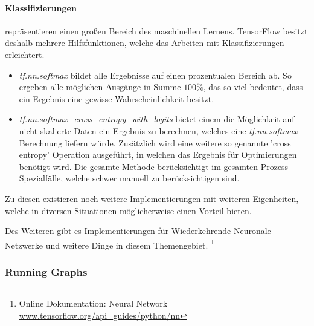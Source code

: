 \paragraph{Klassifizierungen} repräsentieren einen großen Bereich des maschinellen Lernens. 
TensorFlow besitzt deshalb mehrere Hilfsfunktionen, welche das Arbeiten mit Klassifizierungen erleichtert. 
\begin{itemize}
	\item \textit{tf.nn.softmax} bildet alle Ergebnisse auf einen prozentualen Bereich ab. 
	So ergeben alle möglichen Ausgänge in Summe $100\%$, das so viel bedeutet, dass ein Ergebnis eine gewisse Wahrscheinlichkeit besitzt. 
	\item \textit{tf.nn.softmax\_cross\_entropy\_with\_logits} bietet einem die Möglichkeit auf nicht skalierte Daten ein Ergebnis zu berechnen, welches eine \textit{tf.nn.softmax} Berechnung liefern würde. 
	Zusätzlich wird eine weitere so genannte 'cross entropy' Operation ausgeführt, in welchen das Ergebnis für Optimierungen benötigt wird. 
	Die gesamte Methode berücksichtigt im gesamten Prozess Spezialfälle, welche schwer manuell zu berücksichtigen sind. 
\end{itemize}
\phantom \newline

\noindent
Zu diesen existieren noch weitere Implementierungen mit weiteren Eigenheiten, welche in diversen Situationen möglicherweise einen Vorteil bieten. 


\noindent
Des Weiteren gibt es Implementierungen für Wiederkehrende Neuronale Netzwerke und weitere Dinge in diesem Themengebiet. 
\footnote{Online Dokumentation: Neural Network \url{www.tensorflow.org/api_guides/python/nn}}

\subsubsection{Running Graphs}

